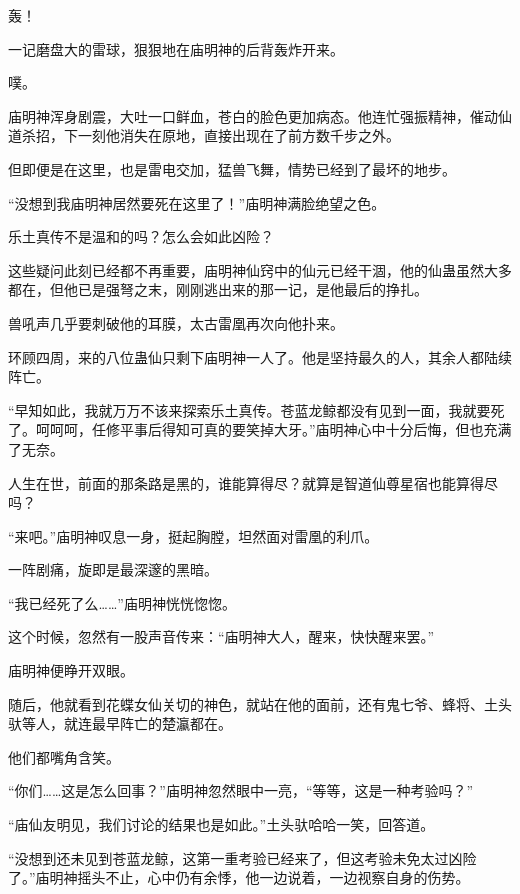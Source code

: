 
\begin{this_body}

轰！

一记磨盘大的雷球，狠狠地在庙明神的后背轰炸开来。

噗。

庙明神浑身剧震，大吐一口鲜血，苍白的脸色更加病态。他连忙强振精神，催动仙道杀招，下一刻他消失在原地，直接出现在了前方数千步之外。

但即便是在这里，也是雷电交加，猛兽飞舞，情势已经到了最坏的地步。

“没想到我庙明神居然要死在这里了！”庙明神满脸绝望之色。

乐土真传不是温和的吗？怎么会如此凶险？

这些疑问此刻已经都不再重要，庙明神仙窍中的仙元已经干涸，他的仙蛊虽然大多都在，但他已是强弩之末，刚刚逃出来的那一记，是他最后的挣扎。

兽吼声几乎要刺破他的耳膜，太古雷凰再次向他扑来。

环顾四周，来的八位蛊仙只剩下庙明神一人了。他是坚持最久的人，其余人都陆续阵亡。

“早知如此，我就万万不该来探索乐土真传。苍蓝龙鲸都没有见到一面，我就要死了。呵呵呵，任修平事后得知可真的要笑掉大牙。”庙明神心中十分后悔，但也充满了无奈。

人生在世，前面的那条路是黑的，谁能算得尽？就算是智道仙尊星宿也能算得尽吗？

“来吧。”庙明神叹息一身，挺起胸膛，坦然面对雷凰的利爪。

一阵剧痛，旋即是最深邃的黑暗。

“我已经死了么……”庙明神恍恍惚惚。

这个时候，忽然有一股声音传来：“庙明神大人，醒来，快快醒来罢。”

庙明神便睁开双眼。

随后，他就看到花蝶女仙关切的神色，就站在他的面前，还有鬼七爷、蜂将、土头驮等人，就连最早阵亡的楚瀛都在。

他们都嘴角含笑。

“你们……这是怎么回事？”庙明神忽然眼中一亮，“等等，这是一种考验吗？”

“庙仙友明见，我们讨论的结果也是如此。”土头驮哈哈一笑，回答道。

“没想到还未见到苍蓝龙鲸，这第一重考验已经来了，但这考验未免太过凶险了。”庙明神摇头不止，心中仍有余悸，他一边说着，一边视察自身的伤势。


\end{this_body}
